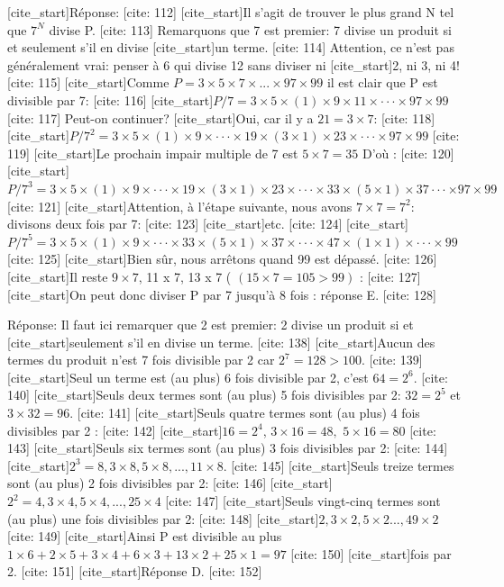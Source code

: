 [cite_start]Réponse: [cite: 112]
[cite_start]Il s'agit de trouver le plus grand N tel que $7^{N}$ divise P. [cite: 113]
Remarquons que 7 est premier: 7 divise un produit si et seulement s'il en divise
[cite_start]un terme. [cite: 114]
Attention, ce n'est pas généralement vrai: penser à 6 qui divise 12 sans diviser ni
[cite_start]2, ni 3, ni 4! [cite: 115]
[cite_start]Comme $P=3\times5\times7\times...\times97\times99$ il est clair que P est divisible par 7: [cite: 116]
[cite_start]$P/7=3\times5\times(1)\times9\times11\times\cdot\cdot\cdot\times97\times99$ [cite: 117]
Peut-on continuer? [cite_start]Oui, car il y a $21=3\times7$: [cite: 118]
[cite_start]$P/7^{2}=3\times5\times(1)\times9\times\cdot\cdot\cdot\times19\times(3\times1)\times23\times\cdot\cdot\cdot\times97\times99$ [cite: 119]
[cite_start]Le prochain impair multiple de 7 est $5\times7=35$ D'où : [cite: 120]
[cite_start]$P/7^{3}=3\times5\times(1)\times9\times\cdot\cdot\cdot\times19\times(3\times1)\times23\times\cdot\cdot\cdot\times33\times(5\times1)\times37\cdot\cdot\cdot\times97\times99$ [cite: 121]
[cite_start]Attention, à l'étape suivante, nous avons $7\times7=7^{2}$: divisons deux fois par 7: [cite: 123]
[cite_start]etc. [cite: 124]
[cite_start]$P/7^{5}=3\times5\times(1)\times9\times\cdot\cdot\cdot\times33\times(5\times1)\times37\times\cdot\cdot\cdot\times47\times(1\times1)\times\cdot\cdot\cdot\times99$ [cite: 125]
[cite_start]Bien sûr, nous arrêtons quand 99 est dépassé. [cite: 126]
[cite_start]Il reste $9\times7$, 11 x 7, 13 x 7 ( $(15\times7=105>99)$ : [cite: 127]
[cite_start]On peut donc diviser P par 7 jusqu'à 8 fois : réponse E. [cite: 128]

Réponse: Il faut ici remarquer que 2 est premier: 2 divise un produit si et
[cite_start]seulement s'il en divise un terme. [cite: 138]
[cite_start]Aucun des termes du produit n'est 7 fois divisible par 2 car $2^{7}=128>100$. [cite: 139]
[cite_start]Seul un terme est (au plus) 6 fois divisible par 2, c'est $64=2^{6}$. [cite: 140]
[cite_start]Seuls deux termes sont (au plus) 5 fois divisibles par 2: $32=2^{5}$ et $3\times32=96$. [cite: 141]
[cite_start]Seuls quatre termes sont (au plus) 4 fois divisibles par 2 : [cite: 142]
[cite_start]$16=2^{4}$, $3\times16=48,$ $5\times16=80$ [cite: 143]
[cite_start]Seuls six termes sont (au plus) 3 fois divisibles par 2: [cite: 144]
[cite_start]$2^{3}=8,3\times8,5\times8,...,11\times8.$ [cite: 145]
[cite_start]Seuls treize termes sont (au plus) 2 fois divisibles par 2: [cite: 146]
[cite_start]$2^{2}=4,3\times4,5\times4,...,25\times4$ [cite: 147]
[cite_start]Seuls vingt-cinq termes sont (au plus) une fois divisibles par 2: [cite: 148]
[cite_start]$2,3\times2,5\times2...,49\times2$ [cite: 149]
[cite_start]Ainsi P est divisible au plus $1\times6+2\times5+3\times4+6\times3+13\times2+25\times1=97$ [cite: 150]
[cite_start]fois par 2. [cite: 151]
[cite_start]Réponse D. [cite: 152]


